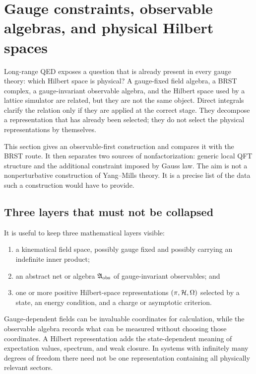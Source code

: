\section{Gauge constraints, observable algebras, and physical Hilbert spaces}
\label{sec:gauge-aqft}

Long-range QED exposes a question that is already present in every gauge
theory: which Hilbert space is physical?  A gauge-fixed field algebra, a
BRST complex, a gauge-invariant observable algebra, and the Hilbert space used
by a lattice simulator are related, but they are not the same object.  Direct
integrals clarify the relation only if they are applied at the correct stage.
They decompose a representation that has already been selected; they do not
select the physical representations by themselves.

This section gives an observable-first construction and compares it with the
BRST route.  It then separates two sources of nonfactorization: generic local
QFT structure and the additional constraint imposed by Gauss law.  The aim is
not a nonperturbative construction of Yang--Mills theory.  It is a precise
list of the data such a construction would have to provide.

\subsection{Three layers that must not be collapsed}

It is useful to keep three mathematical layers visible:
\begin{enumerate}[label=(\roman*)]
  \item a kinematical field space, possibly gauge fixed and possibly carrying
  an indefinite inner product;
  \item an abstract net or algebra $\mathfrak{A}_{\mathrm{obs}}$ of gauge-invariant
  observables; and
  \item one or more positive Hilbert-space representations
  $(\pi,\mathcal{H},\Omega)$ selected by a state, an energy condition, and a charge
  or asymptotic criterion.
\end{enumerate}
Gauge-dependent fields can be invaluable coordinates for calculation, while
the observable algebra records what can be measured without choosing those
coordinates.  A Hilbert representation adds the state-dependent meaning of
expectation values, spectrum, and weak closure.  In systems with infinitely
many degrees of freedom there need not be one representation containing all
physically relevant sectors.


